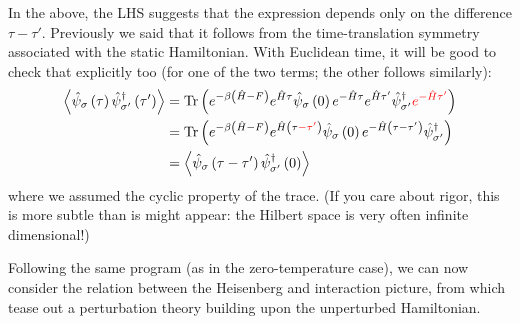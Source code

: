 In the above, the LHS suggests that the expression depends only on the difference $\tau-\tau\prime$. Previously we said that it follows from the time-translation symmetry associated with the static Hamiltonian. With Euclidean time, it will be good to check that explicitly too (for one of the two terms; the other follows similarly):
\begin{align*}
    \left< \hat{\psi}_{\sigma}\left( \tau \right) \hat{\psi}_{\sigma '}^{\dagger}\left( \tau ' \right) \right> &=\mathrm{Tr}\left( e^{-\beta \left( \hat{H}-F \right)}e^{\hat{H}\tau}\hat{\psi}_{\sigma}\left( 0 \right) e^{-\hat{H}\tau}e^{\hat{H}\tau '}\hat{\psi}_{\sigma '}^{\dagger}{\color{red} e^{-\hat{H}\tau '}} \right) \\
    &=\mathrm{Tr}\left( e^{-\beta \left( \hat{H}-F \right)}e^{\hat{H}\left( \tau {\color{red} -\tau '} \right)}\hat{\psi}_{\sigma}\left( 0 \right) e^{-\hat{H}\left( \tau -\tau ' \right)}\hat{\psi}_{\sigma '}^{\dagger} \right) \\
    &=\left< \hat{\psi}_{\sigma}\left( \tau -\tau ' \right) \hat{\psi}_{\sigma '}^{\dagger}\left( 0 \right) \right>
\end{align*}
where we assumed the cyclic property of the trace. (If you care about rigor, this is more subtle than is might appear: the Hilbert space is very often infinite dimensional!)

Following the same program (as in the zero-temperature case), we can now consider the relation between the Heisenberg and interaction picture, from which tease out a perturbation theory building upon the unperturbed Hamiltonian.

